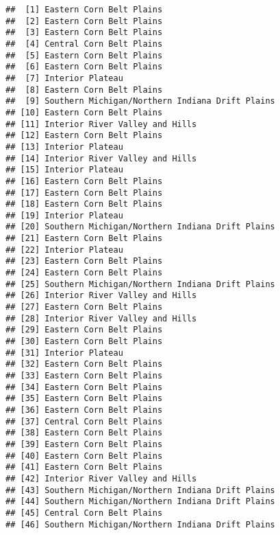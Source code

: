 \documentclass[
]{article}
\begin{document}
\begin{verbatim}
##  [1] Eastern Corn Belt Plains                       
##  [2] Eastern Corn Belt Plains                       
##  [3] Eastern Corn Belt Plains                       
##  [4] Central Corn Belt Plains                       
##  [5] Eastern Corn Belt Plains                       
##  [6] Eastern Corn Belt Plains                       
##  [7] Interior Plateau                               
##  [8] Eastern Corn Belt Plains                       
##  [9] Southern Michigan/Northern Indiana Drift Plains
## [10] Eastern Corn Belt Plains                       
## [11] Interior River Valley and Hills                
## [12] Eastern Corn Belt Plains                       
## [13] Interior Plateau                               
## [14] Interior River Valley and Hills                
## [15] Interior Plateau                               
## [16] Eastern Corn Belt Plains                       
## [17] Eastern Corn Belt Plains                       
## [18] Eastern Corn Belt Plains                       
## [19] Interior Plateau                               
## [20] Southern Michigan/Northern Indiana Drift Plains
## [21] Eastern Corn Belt Plains                       
## [22] Interior Plateau                               
## [23] Eastern Corn Belt Plains                       
## [24] Eastern Corn Belt Plains                       
## [25] Southern Michigan/Northern Indiana Drift Plains
## [26] Interior River Valley and Hills                
## [27] Eastern Corn Belt Plains                       
## [28] Interior River Valley and Hills                
## [29] Eastern Corn Belt Plains                       
## [30] Eastern Corn Belt Plains                       
## [31] Interior Plateau                               
## [32] Eastern Corn Belt Plains                       
## [33] Eastern Corn Belt Plains                       
## [34] Eastern Corn Belt Plains                       
## [35] Eastern Corn Belt Plains                       
## [36] Eastern Corn Belt Plains                       
## [37] Central Corn Belt Plains                       
## [38] Eastern Corn Belt Plains                       
## [39] Eastern Corn Belt Plains                       
## [40] Eastern Corn Belt Plains                       
## [41] Eastern Corn Belt Plains                       
## [42] Interior River Valley and Hills                
## [43] Southern Michigan/Northern Indiana Drift Plains
## [44] Southern Michigan/Northern Indiana Drift Plains
## [45] Central Corn Belt Plains                       
## [46] Southern Michigan/Northern Indiana Drift Plains

\end{verbatim}
\end{document}
